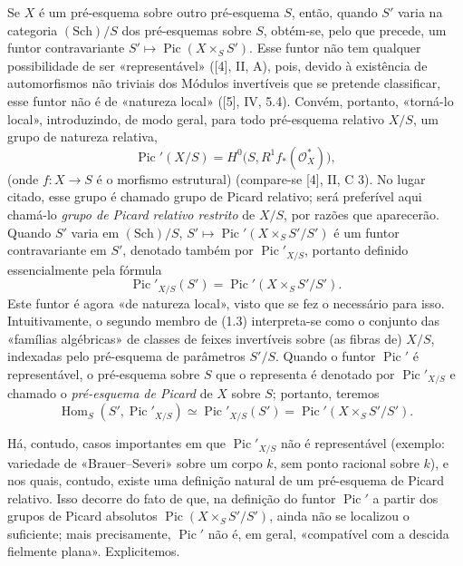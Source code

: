 Se $X$ é um pré-esquema sobre outro pré-esquema $S$, então, quando $S'$ varia
na categoria $(\mathrm{Sch})/S$ dos pré-esquemas sobre $S$, obtém-se, pelo que
precede, um funtor contravariante
$S'\longmapsto\operatorname{Pic}(X\times_S S')$. Esse funtor não tem qualquer
possibilidade de ser «representável» ([4], II, A), pois, devido à existência de
automorfismos não triviais dos Módulos invertíveis que se pretende classificar,
esse funtor não é de «natureza local» ([5], IV, 5.4). Convém, portanto,
«torná-lo local», introduzindo, de modo geral, para todo pré-esquema relativo
$X/S$, um grupo de natureza relativa,
\begin{equation}
\operatorname{Pic}'(X/S)=H^0\bigl(S,R^1f_*(\mathcal O_X^*)\bigr),
\tag{1.2}
\end{equation}
(onde $f:X\longrightarrow S$ é o morfismo estrutural) (compare-se [4], II,
C 3). No lugar citado, esse grupo é chamado grupo de Picard relativo; será
preferível aqui chamá-lo \emph{grupo de Picard relativo restrito} de $X/S$,
por razões que aparecerão. Quando $S'$ varia em $(\mathrm{Sch})/S$,
$S'\longmapsto\operatorname{Pic}'(X\times_S S'/S')$ é um funtor contravariante
em $S'$, denotado também por $\operatorname{Pic}'_{X/S}$, portanto definido
essencialmente pela fórmula
\begin{equation}
\operatorname{Pic}'_{X/S}(S')=
\operatorname{Pic}'(X\times_S S'/S').
\tag{1.3}
\end{equation}
Este funtor é agora «de natureza local», visto que se fez o necessário para
isso. Intuitivamente, o segundo membro de (1.3) interpreta-se como o conjunto
das «famílias algébricas» de classes de feixes invertíveis sobre (as fibras de)
$X/S$, indexadas pelo pré-esquema de parâmetros $S'/S$. Quando o funtor
$\operatorname{Pic}'$ é representável, o pré-esquema sobre $S$ que o representa
é denotado por $\operatorname{Pic}'_{X/S}$ e chamado o
\emph{pré-esquema de Picard} de $X$ sobre $S$; portanto, teremos
\begin{equation}
\operatorname{Hom}_S(S',\operatorname{Pic}'_{X/S})
\simeq\operatorname{Pic}'_{X/S}(S')
=\operatorname{Pic}'(X\times_S S'/S').
\tag{1.4}
\end{equation}

Há, contudo, casos importantes em que $\operatorname{Pic}'_{X/S}$ não é
representável (exemplo: variedade de «Brauer--Severi» sobre um corpo $k$, sem
ponto racional sobre $k$), e nos quais, contudo, existe uma definição natural
de um pré-esquema de Picard relativo. Isso decorre do fato de que, na definição
do funtor $\operatorname{Pic}'$ a partir dos grupos de Picard absolutos
$\operatorname{Pic}(X\times_S S'/S')$, ainda não se localizou o suficiente;
mais precisamente, $\operatorname{Pic}'$ não é, em geral, «compatível com a
descida fielmente plana». Explicitemos.

